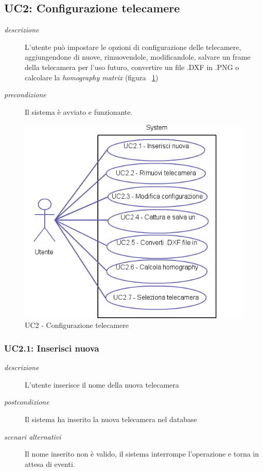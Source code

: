 \subsection{UC2: Configurazione telecamere}
\begin{description}
 \item[\em{descrizione}] L'utente può impostare le opzioni di configurazione delle telecamere, aggiungendone di nuove, rimuovendole, modificandole, salvare un frame della telecamera per l'uso futuro, convertire un file .DXF in .PNG o calcolare la \textit{homography matrix} (figura ~\ref{fig:uc2})
 \item[\em{precondizione}] Il sistema è avviato e funzionante. \end{description}
\begin{figure}[htpb]
\centering
\includegraphics[scale=0.4]{./images/uc2.png}
\caption{UC2 - Configurazione telecamere}
\label{fig:uc2}
\end{figure} 

\subsubsection{UC2.1: Inserisci nuova}
\begin{description}
 \item[\em{descrizione}] L'utente inserisce il nome della nuova telecamera
 \item[\em{postcondizione}] Il sistema ha inserito la nuova telecamera nel database
 \item[\em{scenari alternativi}] Il nome inserito non è valido, il sistema interrompe l'operazione e torna in attesa di eventi.
 \end{description}

